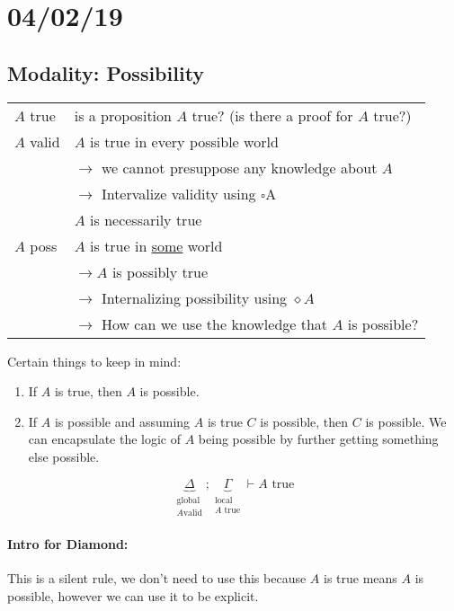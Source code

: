 \documentclass[12 pt]{article}
\begin{document}
      \section{04/02/19}
      \subsection{Modality: Possibility}
      \begin{tabular}{l l}
        $A$ true& is a proposition $A$ true? (is there a proof for $A$ true?)
        \\ $A$ valid & $A$ is true in every possible world
        \\ & $\to$ we cannot presuppose any knowledge about $A$
        \\ & $\to$ Intervalize validity using $\square$A
        \\ & $A$ is necessarily true
        \\ $A$ poss & $A$ is true in \underline{some} world
        \\ & $\to A$ is possibly true
        \\ & $\to$ Internalizing possibility using $\diamond A$
        \\ & $\to$ How can we use the knowledge that $A$ is possible?
      \end{tabular}
      Certain things to keep in mind:
      \begin{enumerate}
      \item If $A$ is true, then $A$ is possible.
      \item If $A$ is possible and assuming $A$ is true $C$ is
        possible, then $C$ is possible. We can encapsulate the logic
        of $A$ being possible by further getting something else possible.
      \end{enumerate}
      $$\underbrace{\Delta}_{\substack{\text{global}\\A\text{
            valid}}};
      \underbrace{\Gamma}_{\substack{\text{local}\\A\text{ true}}}
      \vdash A \text{ true}$$
      \paragraph{Intro for Diamond:}
      \begin{prooftree}
      \end{prooftree}
      \begin{prooftree}
      \end{prooftree}
      This is a silent rule, we don't need to use this because
      $A$ is true means $A$ is possible, however we can use it to be explicit.
\end{document}
